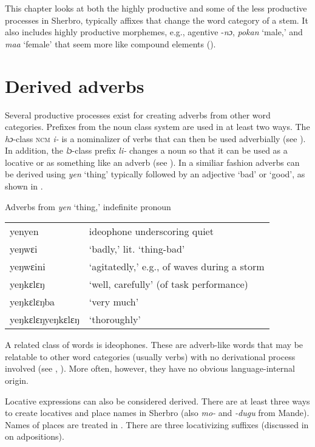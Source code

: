 This chapter looks at both the highly productive and some of the less productive processes in Sherbro, typically affixes that change the word category of a stem. It also includes highly productive morphemes, e.g., agentive -\textit{nɔ}, \textit{pokan} ‘male,' and \textit{maa} ‘female' that seem more like compound elements ().

\section{Derived adverbs}
\label{sec:7.1}\hypertarget{Toc115517805}{}
Several productive processes exist for creating adverbs from other word categories. Prefixes from the noun class system are used in at least two ways. The \textit{hɔ}{}-class \textsc{ncm} \textit{i-} is a nominalizer of verbs that can then be used adverbially (see ). In addition, the \textit{lɔ}{}-class prefix \textit{li-} changes a noun so that it can be used as a locative or as something like an adverb (see ). In a similiar fashion adverbs can be derived using \textit{yen} ‘thing' typically followed by an adjective ‘bad' or ‘good', as shown in .

\TabPositions{1.2cm,3cm,6cm,7cm}

\ea%
    \label{ex:172}  Adverbs from \textit{yen} ‘thing,' indefinite pronoun
    \begin{tabular}{ll}
    yenyen & ideophone underscoring quiet\\
    yeŋwɛi & ‘badly,' lit. ‘thing-bad'\\
    yeŋwɛini & ‘agitatedly,' e.g., of waves during a storm\\
    yeŋkɛlɛŋ & ‘well, carefully' (of task performance)\\
    yeŋkɛlɛŋba & ‘very much'\\
    yeŋkɛlɛŋyeŋkɛlɛŋ & ‘thoroughly'\\
    \end{tabular}
\z

A related class of words is ideophones. These are adverb-like words that may be relatable to other word categories (usually verbs) with no derivational process involved (see , \citealt{Childs1989}). More often, however, they have no obvious language-internal origin.

Locative expressions can also be considered derived. There are at least three ways to create locatives and place names in Sherbro (also \textit{mo-} and \textit{{}-dugu} from Mande). Names of places are treated in . There are three locativizing suffixes (discussed in  on adpositions).

